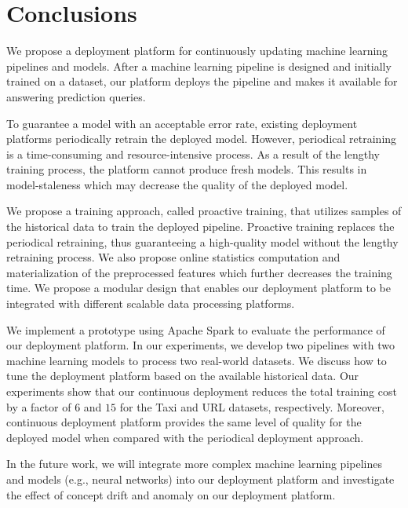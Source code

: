 \section{Conclusions} \label{conclusion}
We propose a deployment platform for continuously updating machine learning pipelines and models.
After a machine learning pipeline is designed and initially trained on a dataset, our platform deploys the pipeline and makes it available for answering prediction queries.

To guarantee a model with an acceptable error rate, existing deployment platforms periodically retrain the deployed model. 
However, periodical retraining is a time-consuming and resource-intensive process.
As a result of the lengthy training process, the platform cannot produce fresh models.
This results in model-staleness which may decrease the quality of the deployed model.

We propose a training approach, called proactive training, that utilizes samples of the historical data to train the deployed pipeline.
Proactive training replaces the periodical retraining, thus guaranteeing a high-quality model without the lengthy retraining process.
We also propose online statistics computation and materialization of the preprocessed features which further decreases the training time.
We propose a modular design that enables our deployment platform to be integrated with different scalable data processing platforms.

We implement a prototype using Apache Spark to evaluate the performance of our deployment platform.
In our experiments, we develop two pipelines with two machine learning models to process two real-world datasets.
We discuss how to tune the deployment platform based on the available historical data.
Our experiments show that our continuous deployment reduces the total training cost by a factor of $6$ and $15$ for the Taxi and URL datasets, respectively.
Moreover, continuous deployment platform provides the same level of quality for the deployed model when compared with the periodical deployment approach.

In the future work, we will integrate more complex machine learning pipelines and models (e.g., neural networks) into our deployment platform and investigate the effect of concept drift and anomaly on our deployment platform.

